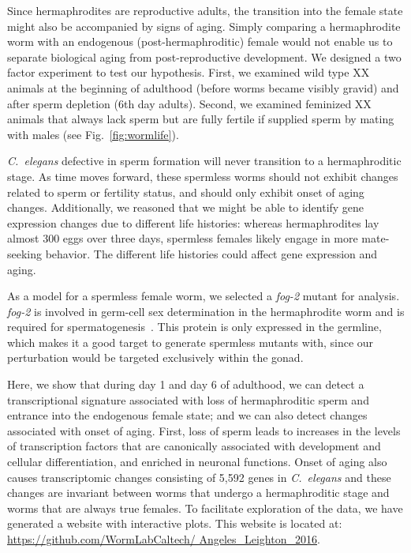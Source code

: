 \documentclass[9pt,twocolumn,twoside]{gsag3jnl}
\newcommand{\cel}{\emph{C.~elegans}}
\newcommand{\fog}{\emph{fog-2}}
\newcommand{\agen}{5,592}
\begin{document}
Since hermaphrodites are reproductive adults, the transition into the female state might also be accompanied by signs of aging. Simply comparing a hermaphrodite worm with an endogenous (post-hermaphroditic) female would not enable us to separate biological aging from post-reproductive development. We designed a two factor experiment to test our hypothesis. First, we examined wild type XX animals at the beginning of adulthood (before worms became visibly gravid) and after sperm depletion (6th day adults). Second, we examined feminized XX animals that always lack sperm but are fully fertile if supplied sperm by mating with males (see Fig.~\ref{fig:wormlife}).

\cel{} defective in sperm formation will never transition to a hermaphroditic stage. As time moves forward, these spermless worms should not exhibit changes related to sperm or fertility status, and should only exhibit onset of aging changes. Additionally, we reasoned that we might be able to identify gene expression changes due to different life histories: whereas hermaphrodites lay almost 300 eggs over three days, spermless females likely engage in more mate-seeking behavior. The different life histories could affect gene expression and aging.

As a model for a spermless female worm, we selected a \fog{} mutant for analysis. \fog{} is involved in germ-cell sex determination in the hermaphrodite worm and is required for spermatogenesis~\citep{Schedl1988,Clifford2000}. This protein is only expressed in the germline, which makes it a good target to generate spermless mutants with, since our perturbation would be targeted exclusively within the gonad.

Here, we show that during day 1 and day 6 of adulthood, we can detect a transcriptional signature associated with loss of hermaphroditic sperm and entrance into the endogenous female state; and we can also detect changes associated with onset of aging. First, loss of sperm leads to increases in the levels of transcription factors that are canonically associated with development and cellular differentiation, and enriched in neuronal functions.
Onset of aging also causes transcriptomic changes consisting of \agen{} genes in \cel{} and these changes are invariant between worms that undergo a hermaphroditic stage and worms that are always true females. To facilitate exploration of the data, we have generated a website with interactive plots. This website is located at: \url{https://github.com/WormLabCaltech/ Angeles_Leighton_2016}.
\end{document}

